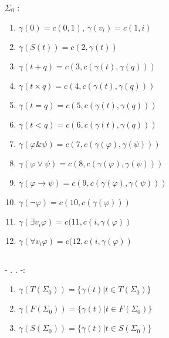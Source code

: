 \textbf{\textcyr{\CYRG\cyryo\cyrd\cyre\cyrl\cyre\cyrv\cyrs\cyrk\cyro\cyrishrt}
\textcyr{\cyrn\cyru\cyrm\cyre\cyrr\cyra\cyrc\cyri\cyre\cyrishrt} }\textcyr{\cyrt\cyre\cyrr\cyrm\cyro\cyrv}
\textcyr{\cyri} \textcyr{\cyrf\cyro\cyrr\cyrm\cyru\cyrl} \textcyr{\cyrs\cyri\cyrg\cyrn\cyra\cyrt\cyru\cyrr\cyrery}
$\Sigma_{0}$ \textcyr{\cyrn\cyra\cyrz\cyrery\cyrv\cyra\cyre\cyrt\cyrs\cyrya}:
\begin{enumerate}
\item $\gamma(0)=c(0,1)$, $\gamma(v_{i})=c(1,i)$
\item $\gamma(S(t))=c(2,\gamma(t))$
\item $\gamma(t+q)=c(3,c(\gamma(t),\gamma(q)))$
\item $\gamma(t\times q)=c(4,c(\gamma(t),\gamma(q)))$
\item $\gamma(t=q)=c(5,c(\gamma(t),\gamma(q)))$
\item $\gamma(t<q)=c(6,c(\gamma(t),\gamma(q)))$
\item $\gamma(\varphi\&\psi)=c(7,c(\gamma(\varphi),\gamma(\psi)))$
\item $\gamma(\varphi\lor\psi)=c(8,c(\gamma(\varphi),\gamma(\psi)))$
\item $\gamma(\varphi\rightarrow\psi)=c(9,c(\gamma(\varphi),\gamma(\psi)))$
\item $\gamma(\neg\varphi)=c(10,c(\gamma(\varphi)))$
\item $\gamma(\exists v_{i}\varphi)=c(11,c(i,\gamma(\varphi))$
\item $\gamma(\forall v_{i}\varphi)=c(12,c(i,\gamma(\varphi))$
\end{enumerate}

\subsection{\textcyr{\CYRP\cyrr\cyre\cyrd\cyrl\cyro\cyrzh\cyre\cyrn\cyri\cyre}}

\textcyr{\CYRS\cyrl\cyre\cyrd\cyru\cyryu\cyrshch\cyri\cyre} \textcyr{\cyrm\cyrn\cyro\cyrzh\cyre\cyrs\cyrt\cyrv\cyra}
- \textcyr{\cyrp\cyrr\cyri\cyrm}. \textcyr{\cyrr\cyre\cyrk}. \textcyr{\cyrm\cyrn}-\textcyr{\cyrv\cyra}:
\begin{enumerate}
\item $\gamma(T(\Sigma_{0}))=\{\gamma(t)|t\in T(\Sigma_{0})\}$
\item $\gamma(F(\Sigma_{0}))=\{\gamma(t)|t\in F(\Sigma_{0})\}$
\item $\gamma(S(\Sigma_{0}))=\{\gamma(t)|t\in S(\Sigma_{0})\}$
\end{enumerate}

